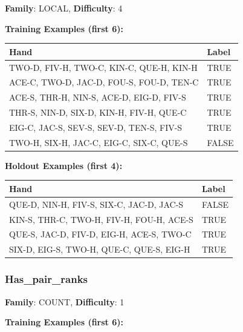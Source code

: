 \documentclass[10pt,a4paper]{article}
\begin{document}
\textbf{Family}: LOCAL, \textbf{Difficulty}: 4

\textbf{Training Examples (first 6):}

\begin{small}
\begin{tabular}{p{8cm}l}
\toprule
Hand & Label \\
\midrule
TWO-D, FIV-H, TWO-C, KIN-C, QUE-H, KIN-H & \textcolor{positive}{TRUE} \\
ACE-C, TWO-D, JAC-D, FOU-S, FOU-D, TEN-C & \textcolor{positive}{TRUE} \\
ACE-S, THR-H, NIN-S, ACE-D, EIG-D, FIV-S & \textcolor{positive}{TRUE} \\
THR-S, NIN-D, SIX-D, KIN-H, FIV-H, QUE-C & \textcolor{positive}{TRUE} \\
EIG-C, JAC-S, SEV-S, SEV-D, TEN-S, FIV-S & \textcolor{positive}{TRUE} \\
TWO-H, SIX-H, JAC-C, EIG-C, SIX-C, QUE-S & \textcolor{negative}{FALSE} \\
\bottomrule
\end{tabular}
\end{small}

\textbf{Holdout Examples (first 4):}

\begin{small}
\begin{tabular}{p{8cm}l}
\toprule
Hand & Label \\
\midrule
QUE-D, NIN-H, FIV-S, SIX-C, JAC-D, JAC-S & \textcolor{negative}{FALSE} \\
KIN-S, THR-C, TWO-H, FIV-H, FOU-H, ACE-S & \textcolor{positive}{TRUE} \\
QUE-S, JAC-D, FIV-D, EIG-H, ACE-S, TWO-C & \textcolor{positive}{TRUE} \\
SIX-D, EIG-S, TWO-H, QUE-C, QUE-S, EIG-H & \textcolor{positive}{TRUE} \\
\bottomrule
\end{tabular}
\end{small}

\vspace{0.5cm}

\subsubsection{Has\_pair\_ranks}

\textbf{Family}: COUNT, \textbf{Difficulty}: 1

\textbf{Training Examples (first 6):}
\end{document}
